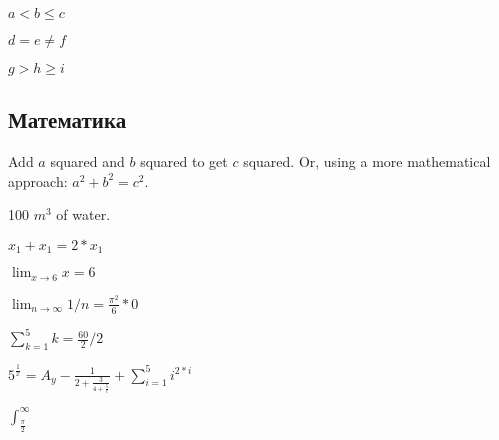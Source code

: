 \documentclass[11pt,oneside,a4paper]{article}
\begin{document}
$a < b \le c$

$d = e \ne f$

$g > h \ge i$

\subsection{Математика}

Add $a$ squared and $b$ squared to get $c$ squared.
Or, using a more mathematical approach: $a^2 + b^{2} = c^2$.

100 $m^{3}$ of water.

$x_{1} + x_{1} = 2 * x_{1}$

$\lim_{x \to 6}{x} = 6$

$\lim_{n \to \infty}{1/n} = \frac{\pi^2}{6} * 0$

$\sum_{k=1}^{5}{k} = \frac{60}{2}/2$

${5^{\frac{1}{x}} = A}_{y} - \frac{1}{2 + \frac{3}{4 + \frac{5}{c}}} + \sum_{i=1}^{5}{i^{2*i}}$

$\int_{\frac{\pi}{2}}^{\infty}$
 
\end{document}

